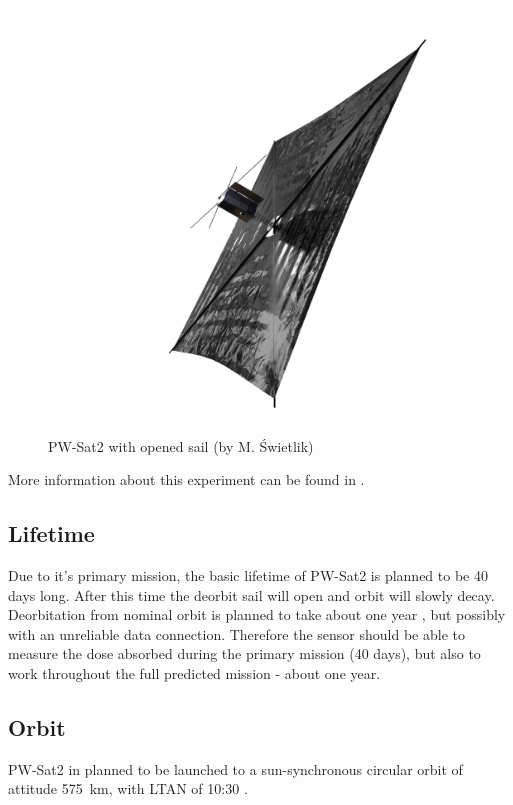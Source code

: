         \begin{figure}[H]
            \centering
            \includegraphics[width=0.7\paperwidth]{img/04/PW-Sat2_render_02.png}
            \caption{PW-Sat2 with opened sail (by M. Świetlik)}
            \label{PW-Sat_render_sail}
        \end{figure}

        More information about this experiment can be found in \cite{DDC_article}.

    \subsection{Lifetime}
        Due to it's primary mission, the basic lifetime of PW-Sat2 is planned to be 40 days long. After this time the deorbit sail will open and orbit will slowly decay. Deorbitation from nominal orbit is planned to take about one year \cite{PWSAT_MA_CDR}, but possibly with an unreliable data connection. Therefore the sensor should be able to measure the dose absorbed during the primary mission (40 days), but also to work throughout the full predicted mission - about one year.

    \subsection{Orbit}
        PW-Sat2 in planned to be launched to a sun-synchronous circular orbit of attitude \SI{575}{\kilo\meter}, with LTAN of 10:30 \cite{PWSAT_MA_CDR}.


